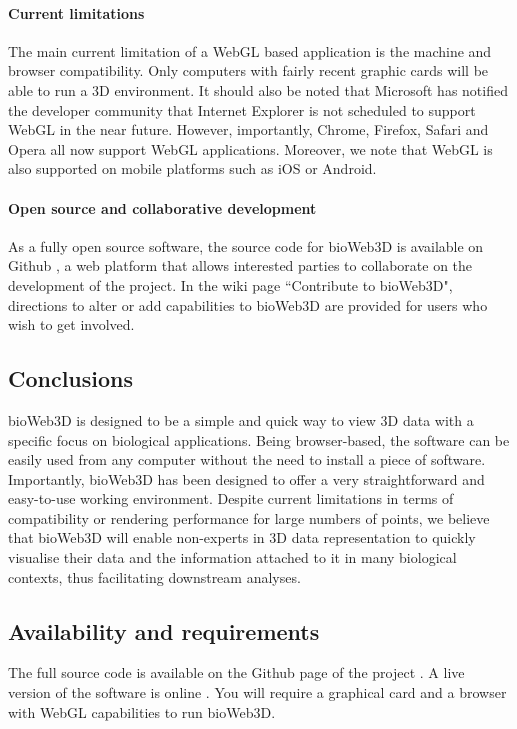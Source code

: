 		\paragraph{Current limitations}
The main current limitation of a WebGL based application is the machine and browser compatibility. Only computers with fairly recent graphic cards will be able to run a 3D environment. It should also be noted that Microsoft has notified the developer community that Internet Explorer is not scheduled to support WebGL in the near future. However, importantly, Chrome, Firefox, Safari and Opera all now support WebGL applications. Moreover, we note that WebGL is also supported on mobile platforms such as iOS or Android. \cite{caniuse}


		\paragraph{Open source and collaborative development}
As a fully open source software, the source code for bioWeb3D is available on Github \cite{github}, a web platform that allows interested parties to collaborate on the development of the project. In the wiki page ``Contribute to bioWeb3D", directions to alter or add capabilities to bioWeb3D are provided for users who wish to get involved.

	\subsection{Conclusions}
bioWeb3D is designed to be a simple and quick way to view 3D data with a specific focus on biological applications.  Being browser-based, the software can be easily used from any computer without the need to install a piece of software. Importantly, bioWeb3D has been designed to offer a very straightforward and easy-to-use working environment. Despite current limitations in terms of compatibility or rendering performance for large numbers of points, we believe that bioWeb3D will enable non-experts in 3D data representation to quickly visualise their data and the information attached to it in many biological contexts, thus facilitating downstream analyses.

	\subsection{Availability and requirements}
The full source code is available on the Github page of the project \cite{github}. A live version of the software is online \cite{bioWeb3D}. You will require a graphical card and a browser with WebGL capabilities to run bioWeb3D.

